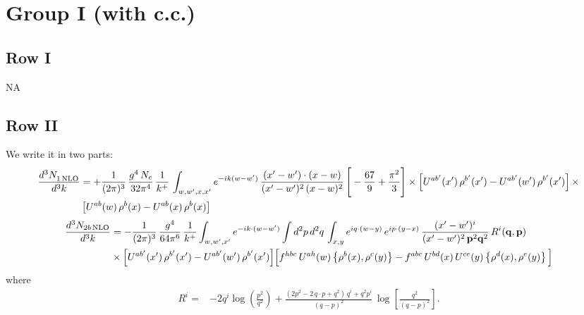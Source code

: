 \documentclass[9pt]{article}
\numberwithin{equation}{section}
\begin{document}
\section{Group I (with c.c.)}
\subsection{Row I}
\textsc{NA}
\subsection{Row II}
We write it in two parts:
\begin{align}
     \frac{d^{3}N_{1\,\rm NLO}^{\rm}}{d^{3}k} &  =  +\frac{1}{(2\pi)^{3}}\, \frac{g^{4}\,N_{c}}{32\pi^{4}}\,\frac{1}{k^{+}}\, \int_{w, w',x,x'} e^{-ik(w-w^\prime)}\, \frac{(x'-w')\cdot (x-w)}{(x'-w')^{2}\, (x-w)^{2}}\, \Bigg[ -\frac{67}{9}+\frac{\pi^{2}}{3}\Bigg]\times \left[U^{ab'}(x')\,\rho^{b'}(x') - U^{ab'}(w')\,\rho^{b'}(x')\right]\times\notag \\ & \left[U^{ab}(w)\,\rho^{b}(x) - U^{ab}(x)\,\rho^{b}(x)\right]
\end{align}
\begin{align}
\frac{d^{3}N_{2b\,\rm NLO}}{d^{3}k} & = -\frac{1}{(2\pi)^{3}}\,\frac{g^{4}}{64\pi^{6}}\,\frac{1}{k^{+}}\int_{w,w',x'} e^{-ik\cdot(w-w')}
\int d^{2}p\,d^{2}q\,\int_{x,y} e^{iq\cdot(w-y)}\,e^{ip\cdot(y-x)}\,\frac{(x'-w')^{i}}{(x'-w')^{2}\,\mathbf{p}^{2}\mathbf{q}^{2}}\,R^{i}(\mathbf{q},\mathbf{p})\notag\\
&\times\Big[U^{ab'}(x')\,\rho^{b'}(x')-U^{ab'}(w')\,\rho^{b'}(x')\Big]
\Big[f^{hbc}\,U^{ah}(w)\left\{\rho^{b}(x),\rho^{c}(y)\right\}-f^{abc}\,U^{bd}(x)\,U^{ce}(y)\left\{\rho^{d}(x),\rho^{e}(y)\right\}\Big]
\end{align}
where
\begin{align}
R^{i} =& -2q^{i}\log\left(\frac{p^{2}}{q^{2}}\right)
+\frac{(2p^{2}-2\,q\cdot p+q^{2})\,q^{i}+q^{2}p^{i}}{(q-p)^{2}}\,
\log\left[\frac{q^{2}}{(q-p)^{2}}\right].
\end{align}
\end{document}
